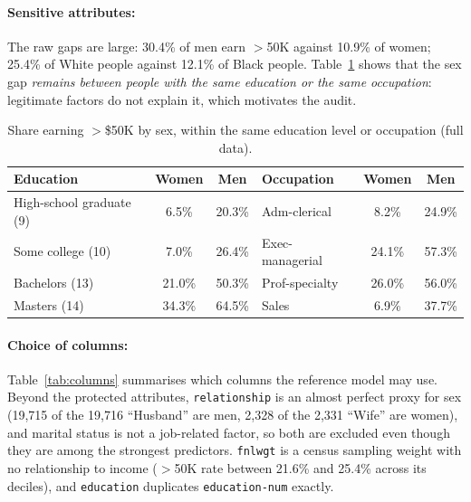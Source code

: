 \documentclass[11pt,a4paper]{article}
\begin{document}
\paragraph{Sensitive attributes:} The raw gaps are large: 30.4\% of men earn $>$50K against 10.9\% of women; 25.4\% of White people against 12.1\% of Black people. Table~\ref{tab:gap_within} shows that the sex gap \emph{remains between people with the same education or the same occupation}: legitimate factors do not explain it, which motivates the audit.

\begin{table}[H]
\centering\small
\caption{Share earning $>$\$50K by sex, within the same education level or occupation (full data).}
\label{tab:gap_within}
\begin{tabular}{lcc@{\hspace{1.2cm}}lcc}
\toprule
\rowcolor{headblue}
Education & Women & Men & Occupation & Women & Men \\
\midrule
High-school graduate (9) & 6.5\% & 20.3\% & Adm-clerical & 8.2\% & 24.9\% \\
Some college (10) & 7.0\% & 26.4\% & Exec-managerial & 24.1\% & 57.3\% \\
Bachelors (13) & 21.0\% & 50.3\% & Prof-specialty & 26.0\% & 56.0\% \\
Masters (14) & 34.3\% & 64.5\% & Sales & 6.9\% & 37.7\% \\
\bottomrule
\end{tabular}
\end{table}

\paragraph{Choice of columns:} Table~\ref{tab:columns} summarises which columns the reference model may use. Beyond the protected attributes, \texttt{relationship} is an almost perfect proxy for sex (19{,}715 of the 19{,}716 ``Husband'' are men, 2{,}328 of the 2{,}331 ``Wife'' are women), and marital status is not a job-related factor, so both are excluded even though they are among the strongest predictors. \texttt{fnlwgt} is a census sampling weight with no relationship to income ($>$50K rate between 21.6\% and 25.4\% across its deciles), and \texttt{education} duplicates \texttt{education-num} exactly.
\end{document}
